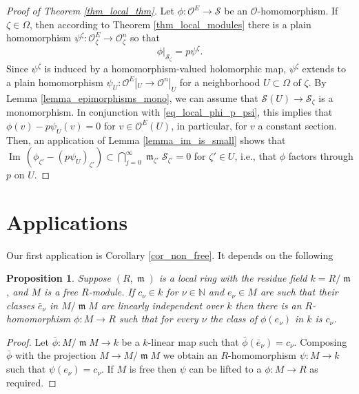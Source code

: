 \documentclass{amsart}
\numberwithin{equation}{section}
\theoremstyle{definition}
\theoremstyle{plain}
\newtheorem{proposition}[definition]{Proposition}
\theoremstyle{remark}
\begin{document}
\begin{proof}[Proof of Theorem \ref{thm_local_thm}]
Let $\phi:{\ensuremath{\mathcal{{O}}}}^E\rightarrow{\ensuremath{\mathcal{{S}}}}$ be an ${\ensuremath{\mathcal{{O}}}}$-homomorphism.
If 
$\zeta\in\Omega$, then 
according to Theorem \ref{thm_local_modules}  there is
a plain homomorphism 
$\psi^\zeta:{\ensuremath{\mathcal{{O}}}}^E_\zeta\rightarrow {\ensuremath{\mathcal{{O}}}}^n_\zeta$ 
so that 
\begin{equation} \label{eq_local_phi_p_psi}
	\phi|_{{\ensuremath{\mathcal{{S}}}}_\zeta}=p \psi^\zeta. 
\end{equation}
Since $\psi^\zeta$ is induced by a homomorphism-valued holomorphic map,
$\psi^\zeta$ 
extends to a plain homomorphism 
$\psi_U:{\ensuremath{\mathcal{{O}}}}^E|_U\rightarrow{\ensuremath{\mathcal{{O}}}}^n|_U$
for a neighborhood  $U\subset\Omega$  of $\zeta$.
By Lemma \ref{lemma_epimorphisms_mono}, we can assume that 
${\ensuremath{\mathcal{{S}}}}(U)\rightarrow{\ensuremath{\mathcal{{S}}}}_\zeta$ is a monomorphism. 
In conjunction with \eqref{eq_local_phi_p_psi}, this implies that 
$\phi(v)-p\psi_U(v)=0$ for $v\in {\ensuremath{\mathcal{{O}}}}^E(U)$, in particular,  
for $v$ a constant section. Then, an application of Lemma 
\ref{lemma_im_is_small} shows that
 ${{\mathop{\mathrm{Im\,}}}} (\phi_{\zeta'}-(p\psi_U)_{\zeta'})\subset \bigcap_{j=0}^\infty {{\mathop{\mathfrak{m}}}}_{\zeta'}{\ensuremath{\mathcal{{S}}}}_{\zeta'}=0$ for $\zeta'\in U$, i.e.,
that $\phi$ factors through $p$ on $U$.
\end{proof}

\section{ Applications}
Our first application is Corollary \ref{cor_non_free}. It depends on the 
following
\begin{proposition}\label{prop_applications_seq}
Suppose $(R,{{\mathop{\mathfrak{m}}}})$ is a local ring with the residue field
$k=R/{{\mathop{\mathfrak{m}}}}$, and $M$ is a free $R$-module. If
$c_\nu\in k$ for $\nu\in \mathbb{N}$   and $e_\nu\in M$ are such that
their classes $\bar e_\nu$ in $M/{{\mathop{\mathfrak{m}}}} M$ are linearly independent over $k$
then there is an $R$-homomorphism $\phi:M\rightarrow R$ such that
for every $\nu$ the class of $\phi(e_\nu)$ in $k$ is $c_\nu$.
\end{proposition}
\begin{proof}
Let $\bar\phi:M/{{\mathop{\mathfrak{m}}}} M\rightarrow k$ be a $k$-linear map such that
$\bar\phi(\bar e_\nu)=c_\nu$. Composing $\bar\phi$ with the projection $M\rightarrow M/{{\mathop{\mathfrak{m}}}} M$ we obtain an $R$-homomorphism $\psi:M\rightarrow k$
such that $\psi(e_\nu)=c_\nu$. If $M$ is free then 
$\psi$ can be lifted to a $\phi:M\rightarrow R$ as required.
\end{proof}
\end{document}
